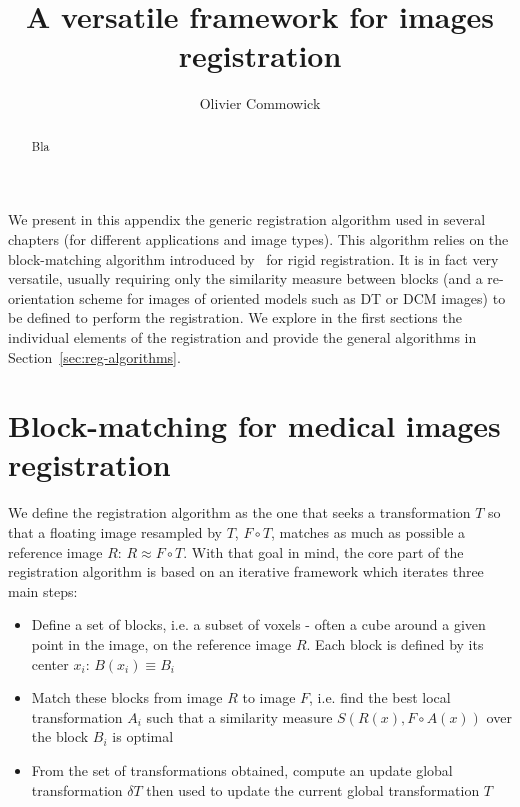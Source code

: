 \documentclass[a4paper]{article}
\title{A versatile framework for images registration}
\author{Olivier Commowick}
\begin{document}
\maketitle

\begin{abstract}
Bla
\end{abstract}

\tableofcontents

\newpage

We present in this appendix the generic registration algorithm used in several chapters (for different applications and image types). This algorithm relies on the block-matching algorithm introduced by~\cite{Ourselin_Miccai_2000} for rigid registration. It is in fact very versatile, usually requiring only the similarity measure between blocks (and a re-orientation scheme for images of oriented models such as DT or DCM images) to be defined to perform the registration. We explore in the first sections the individual elements of the registration and provide the general algorithms in Section~\ref{sec:reg-algorithms}.

\section{Block-matching for medical images registration}

We define the registration algorithm as the one that seeks a transformation $T$ so that a floating image resampled by $T$, $F \circ T$, matches as much as possible a reference image $R$: $R \approx F \circ T$. With that goal in mind, the core part of the registration algorithm is based on an iterative framework which iterates three main steps:

\begin{itemize}
	\item Define a set of blocks, i.e. a subset of voxels - often a cube around a given point in the image, on the reference image $R$. Each block is defined by its center $x_i$: $B(x_i) \equiv B_i$
	\item Match these blocks from image $R$ to image $F$, i.e. find the best local transformation $A_i$ such that a similarity measure $S(R(x), F \circ A(x))$ over the block $B_i$ is optimal
	\item From the set of transformations obtained, compute an update global transformation $\delta T$ then used to update the current global transformation $T$
\end{itemize}
\end{document}
